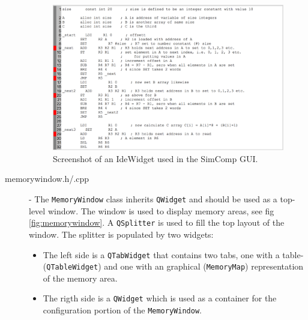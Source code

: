 \begin{description}
\begin{figure}[H]
\centering
\includegraphics[scale=0.43]{img/IdeWidget.png}
\caption{Screenshot of an IdeWidget used in the SimComp GUI.}
\label{fig:idewidget}
\end{figure}

\item [memorywindow.h/.cpp] - The \texttt{MemoryWindow} class inherits \texttt{QWidget} and should be used as a top-level window.
The window is used to display memory areas, see fig \ref{fig:memorywindow}. A \texttt{QSplitter} is used to fill the top layout of the window. The splitter is populated by two widgets: 

\begin{itemize}
    \item The left side is a \texttt{QTabWidget} that contains two tabs, one with a table- (\texttt{QTableWidget}) and one with an graphical (\texttt{MemoryMap}) representation of the memory area.
    \item The rigth side is a \texttt{QWidget} which is used as a container for the configuration portion of the \texttt{MemoryWindow}.
\end{itemize}


\end{description}
